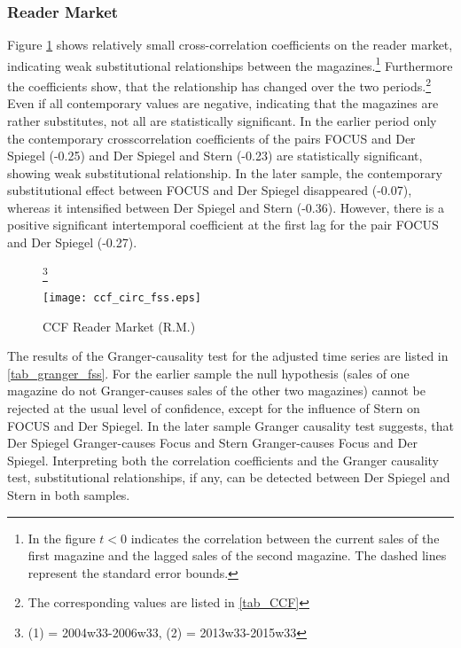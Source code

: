 \documentclass[12pt,a4paper]{scrreprt}
\begin{document}
\subsubsection{Reader Market}
Figure \ref{fig_ccf_circ_fss} shows relatively small cross-correlation coefficients on the reader market, indicating weak substitutional relationships between the magazines.\footnote{In the figure $t<0$ indicates the correlation between the current sales of the first magazine and the lagged sales of the second magazine. The dashed lines represent the standard error bounds.} Furthermore the coefficients show, that the relationship has changed over the two periods.\footnote{The corresponding values are listed in \ref{tab_CCF}} Even if all contemporary values are negative, indicating that the magazines are rather substitutes, not all are statistically significant. In the earlier period only the contemporary crosscorrelation coefficients of the pairs FOCUS and Der Spiegel (-0.25) and Der Spiegel and Stern (-0.23) are statistically significant, showing weak substitutional relationship. In the later sample, the contemporary substitutional effect between FOCUS and Der Spiegel disappeared (-0.07), whereas it intensified between Der Spiegel and Stern (-0.36). However, there is a positive significant intertemporal coefficient at the first lag for the pair FOCUS and Der Spiegel (-0.27). \\

\begin{figure}[H]\footnote{(1) = 2004w33-2006w33, (2) = 2013w33-2015w33}
\caption{CCF Reader Market (R.M.)}
\label{fig_ccf_circ_fss}
	\centering
	\texttt{[image: ccf\_circ\_fss.eps]}
\end{figure}

The results of the Granger-causality test for the adjusted time series are listed in \ref{tab_granger_fss}. For the earlier sample the null hypothesis (sales of one magazine do not Granger-causes sales of the other two magazines) cannot be rejected at the usual level of confidence, except for the  influence of Stern on FOCUS and Der Spiegel. In the later sample Granger causality test suggests, that Der Spiegel Granger-causes Focus and Stern Granger-causes Focus and Der Spiegel. Interpreting both the correlation coefficients and the Granger causality test, substitutional relationships, if any, can be detected between Der Spiegel and Stern in both samples. 
\end{document}
